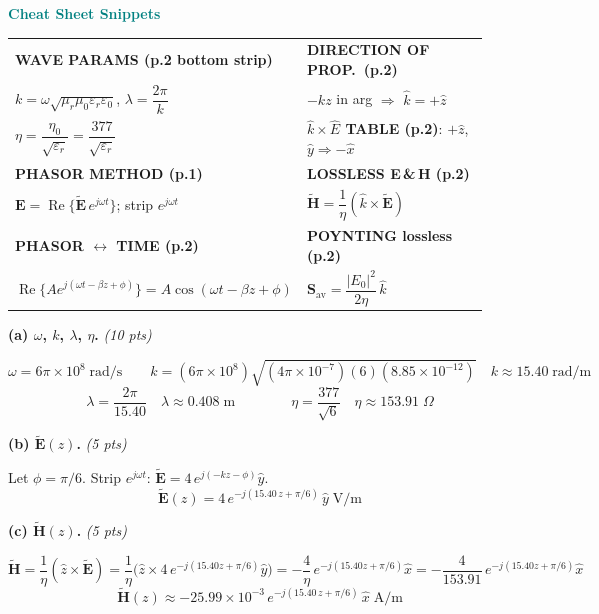 \documentclass[11pt,letterpaper]{article}
\begin{document}
\begin{cssnip}
\textbf{\small\textcolor{teal}{Cheat Sheet Snippets}}\\[3pt]
\begin{tabular}{@{}p{0.47\linewidth}p{0.47\linewidth}@{}}
\textbf{WAVE PARAMS (p.2 bottom strip)} & \textbf{DIRECTION OF PROP.\ (p.2)}\\
$k=\omega\sqrt{\mu_r\mu_0\varepsilon_r\varepsilon_0}$,\; $\lambda=\dfrac{2\pi}{k}$ &
$-kz$ in arg $\Rightarrow$ $\hat{k}=+\hat{z}$\\[3pt]
$\eta=\dfrac{\eta_0}{\sqrt{\varepsilon_r}}=\dfrac{377}{\sqrt{\varepsilon_r}}$ &
\textbf{$\hat{k}\times\hat{E}$ TABLE (p.2)}: $+\hat{z}$, $\hat{y}\Rightarrow-\hat{x}$\\[5pt]
\textbf{PHASOR METHOD (p.1)} & \textbf{LOSSLESS E\,\&\,H (p.2)}\\
$\mathbf{E}=\operatorname{Re}\!\{\tilde{\mathbf{E}}\,e^{j\omega t}\}$; strip $e^{j\omega t}$ &
$\tilde{\mathbf{H}}=\dfrac{1}{\eta}(\hat{k}\times\tilde{\mathbf{E}})$\\[5pt]
\textbf{PHASOR $\leftrightarrow$ TIME (p.2)} & \textbf{POYNTING lossless (p.2)}\\
$\operatorname{Re}\!\{Ae^{j(\omega t-\beta z+\phi)}\}=A\cos(\omega t-\beta z+\phi)$ &
$\mathbf{S}_\text{av}=\dfrac{|E_0|^2}{2\eta}\,\hat{k}$\\
\end{tabular}
\end{cssnip}

\textbf{(a) $\omega$, $k$, $\lambda$, $\eta$.} \hfill\textit{(10 pts)}

\[
\boxed{\omega = 6\pi\times10^8\;\text{rad/s}}
\qquad
k=(6\pi\times10^8)\sqrt{(4\pi\times10^{-7})(6)(8.85\times10^{-12})}
\quad\boxed{k\approx15.40\;\text{rad/m}}
\]
\[
\lambda=\frac{2\pi}{15.40}\quad\boxed{\lambda\approx0.408\;\text{m}}
\qquad\qquad
\eta=\frac{377}{\sqrt{6}}\quad\boxed{\eta\approx153.91\;\Omega}
\]

\textbf{(b) $\tilde{\mathbf{E}}(z)$.} \hfill\textit{(5 pts)}

Let $\phi=\pi/6$. Strip $e^{j\omega t}$: $\tilde{\mathbf{E}}=4\,e^{j(-kz-\phi)}\hat{y}$.
\[
\boxed{\tilde{\mathbf{E}}(z)=4\,e^{-j(15.40\,z+\pi/6)}\,\hat{y}\;\text{V/m}}
\]

\textbf{(c) $\tilde{\mathbf{H}}(z)$.} \hfill\textit{(5 pts)}

\[
\tilde{\mathbf{H}}=\frac{1}{\eta}(\hat{z}\times\tilde{\mathbf{E}})
=\frac{1}{\eta}\bigl(\hat{z}\times4\,e^{-j(15.40z+\pi/6)}\hat{y}\bigr)
=-\frac{4}{\eta}\,e^{-j(15.40z+\pi/6)}\hat{x}
=-\frac{4}{153.91}\,e^{-j(15.40z+\pi/6)}\hat{x}
\]
\[
\boxed{\tilde{\mathbf{H}}(z)\approx-25.99\times10^{-3}\,e^{-j(15.40\,z+\pi/6)}\,\hat{x}\;\text{A/m}}
\]
\end{document}
